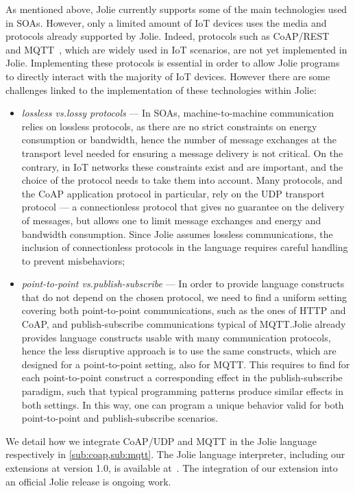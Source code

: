 As mentioned above, Jolie currently supports some of the main technologies used
in SOAs. However, only a limited amount of IoT devices uses the media and
protocols already supported by Jolie. Indeed, protocols such as
CoAP/REST~\cite{doi:10.17487/RFC7252,coap} and MQTT~\cite{mqtt-v3.1.1,mqtt},
which are widely used in IoT scenarios, are not yet implemented in Jolie.
Implementing these protocols is essential in order to allow Jolie programs to
directly interact with the majority of IoT devices. However there are some
challenges linked to the implementation of these technologies within Jolie:

\begin{itemize}
  \item \textit{lossless vs.\@ lossy protocols} --- In SOAs,
  machine-to-machine communication relies on lossless protocols, as there are no
  strict constraints on energy consumption or bandwidth, hence the number of
  message exchanges at the transport level needed for ensuring a message
  delivery is not critical. On the contrary, in IoT networks these
  constraints exist and are important, and the choice of the protocol needs to
  take them into account. Many protocols, and the CoAP application protocol in
  particular, rely on the UDP transport protocol --- a connectionless protocol
  that gives no guarantee on the delivery of messages, but allows one to limit
  message exchanges and energy and bandwidth consumption. Since Jolie assumes
  lossless communications, the inclusion of connectionless protocols in the
  language requires careful handling to prevent misbehaviors;

  \item \textit{point-to-point vs.\@ publish-subscribe} --- In order
  to provide language constructs that do not depend on the chosen protocol, we
  need to find a uniform setting covering both point-to-point communications,
  such as the ones of HTTP and CoAP, and publish-subscribe communications
  typical of MQTT.\@ Jolie already provides language constructs usable with many
  communication protocols, hence the less disruptive approach is to use the same
  constructs, which are designed for a point-to-point setting, also for MQTT.\@
  This requires to find for each point-to-point construct a corresponding effect
  in the publish-subscribe paradigm, such that typical programming patterns
  produce similar effects in both settings. In this way, one can program a
  unique behavior valid for both point-to-point and publish-subscribe
  scenarios.
  
\end{itemize} 

We detail how we integrate CoAP/UDP and MQTT in the Jolie language respectively
in \cref{sub:coap,sub:mqtt}.
%
The Jolie language interpreter, including our extensions at version 1.0, is
available at~\cite{jiot}. The integration of our extension into an official
Jolie release is ongoing work.

